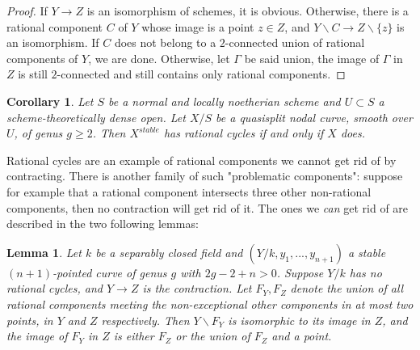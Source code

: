 \documentclass[a4paper,10pt,twoside]{article}
\newcommand{\ra}{\rightarrow}
\newtheorem{lem}[thm]{Lemma}
\newtheorem{cor}[thm]{Corollary}
\theoremstyle{definition}
\theoremstyle{remark}
\begin{document}
\begin{proof}
If $Y\ra Z$ is an isomorphism of schemes, it is obvious. Otherwise, there is a rational component $C$ of $Y$ whose image is a point $z\in Z$, and $Y\backslash C\ra Z\backslash \{z\}$ is an isomorphism. If $C$ does not belong to a $2$-connected union of rational components of $Y$, we are done. Otherwise, let $\Gamma$ be said union, the image of $\Gamma$ in $Z$ is still $2$-connected and still contains only rational components.
\end{proof}

\begin{cor}\label{corollary X^stable has rational cycles iff X does}
Let $S$ be a normal and locally noetherian scheme and $U\subset S$ a scheme-theoretically dense open. Let $X/S$ be a quasisplit nodal curve, smooth over $U$, of genus $g\geq 2$. Then $X^{stable}$ has rational cycles if and only if $X$ does.
\end{cor}

Rational cycles are an example of rational components we cannot get rid of by contracting. There is another family of such "problematic components": suppose for example that a rational component intersects three other non-rational components, then no contraction will get rid of it. The ones we \emph{can} get rid of are described in the two following lemmas:

\begin{lem}
Let $k$ be a separably closed field and $(Y/k,y_1,...,y_{n+1})$ a stable $(n+1)$-pointed curve of genus $g$ with $2g-2+n>0$. Suppose $Y/k$ has no rational cycles, and $Y\ra Z$ is the contraction. Let $F_Y,F_Z$ denote the union of all rational components meeting the non-exceptional other components in at most two points, in $Y$ and $Z$ respectively. Then $Y\backslash F_Y$ is isomorphic to its image in $Z$, and the image of $F_Y$ in $Z$ is either $F_Z$ or the union of $F_Z$ and a point.
\end{lem}
\end{document}
